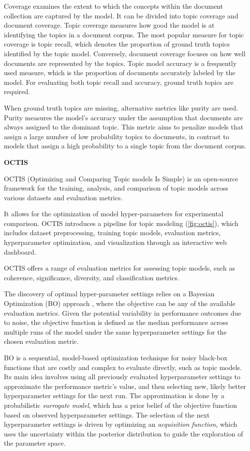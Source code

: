\documentclass{article}
\begin{document}
Coverage examines the extent to which the concepts within the document collection are captured by the model. It can be divided into topic coverage and document coverage. Topic coverage measures how good the model is at identifying the topics in a document corpus. The most popular measure for topic coverage is topic recall, which denotes the proportion of ground truth topics identified by the topic model. Conversely, document coverage focuses on how well documents are represented by the topics. Topic model accuracy is a frequently used measure, which is the proportion of documents accurately labeled by the model. For evaluating both topic recall and accuracy, ground truth topics are required.

When ground truth topics are missing, alternative metrics like purity are used. Purity measures the model's accuracy under the assumption that documents are always assigned to the dominant topic. This metric aims to penalize models that assign a large number of low probability topics to documents, in contrast to models that assign a high probability to a single topic from the document corpus.

\textbf{OCTIS}

OCTIS (Optimizing and Comparing Topic models Is Simple) \cite{terragni_octis_2021} is an open-source framework for the training, analysis, and comparison of topic models across various datasets and evaluation metrics.

It allows for the optimization of model hyper-parameters for experimental comparison. OCTIS introduces a pipeline for topic modeling (\cref{fig:octis}), which includes dataset preprocessing, training topic models, evaluation metrics, hyperparameter optimization, and visualization through an interactive web dashboard.

OCTIS offers a range of evaluation metrics for assessing topic models, such as coherence, significance, diversity, and classification metrics.

The discovery of optimal hyper-parameter settings relies on a Bayesian Optimization (BO) approach \cite{archetti_bayesian_2019, galuzzi_hyperparameter_2020, snoek_practical_2012}, where the objective can be any of the available evaluation metrics. Given the potential variability in performance outcomes due to noise, the objective function is defined as the median performance across multiple runs of the model under the same hyperparameter settings for the chosen evaluation metric.

BO is a sequential, model-based optimization technique for noisy black-box functions that are costly and complex to evaluate directly, such as topic models. Its main idea involves using all previously evaluated hyperparameter settings to approximate the performance metric's value, and then selecting new, likely better hyperparameter settings for the next run. The approximation is done by a probabilistic \textit{surrogate model}, which has a prior belief of the objective function based on observed hyperparameter settings. The selection of the next hyperparameter settings is driven by optimizing an \textit{acquisition function}, which uses the uncertainty within the posterior distribution to guide the exploration of the parameter space.
\end{document}
